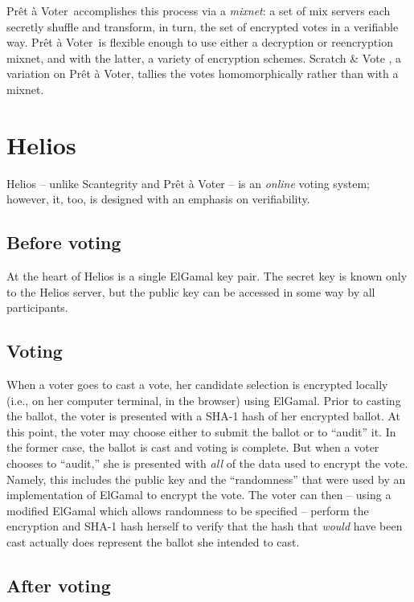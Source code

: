 \documentclass[10pt,twocolumn]{article}
\newcommand{\term}[1]{\textit{#1}}
\newcommand{\preta}{Pr\^{e}t \`{a}}
\newcommand{\pv}{\preta{} Voter}
\begin{document}
\pv\ accomplishes this process via a \term{mixnet}: a set of mix servers each secretly shuffle and transform, in turn, the set of encrypted votes in a verifiable way.
\pv\ is flexible enough to use either a decryption or reencryption mixnet, and with the latter, a variety of encryption schemes.
Scratch \& Vote \cite{scratch}, a variation on \pv, tallies the votes homomorphically rather than with a mixnet.

\section{Helios}

Helios \cite{helios} -- unlike Scantegrity and \pv{} -- is an \emph{online} voting
system; however, it, too, is designed with an emphasis on verifiability.

\subsection{Before voting}

At the heart of Helios is a single ElGamal key pair. The secret key is known only to the Helios
server, but the public key can be accessed in some way by all participants.

\subsection{Voting}

When a voter goes to cast a vote, her candidate selection is encrypted locally (i.e., on her
computer terminal, in the browser) using ElGamal. Prior to casting the ballot, the voter is
presented with a SHA-1 hash of her encrypted ballot. At this point, the voter may choose either
to submit the ballot or to ``audit'' it. In the former case, the ballot is cast and voting is
complete. But when a voter chooses to ``audit,'' she is presented with \emph{all} of the data
used to encrypt the vote. Namely, this includes the public key and the ``randomness'' that were used
by an implementation of ElGamal to encrypt the vote. The voter can then -- using a modified ElGamal
which allows randomness to be specified -- perform the encryption and SHA-1 hash herself
to verify that the hash that \emph{would} have been cast actually does represent the ballot she
intended to cast.

\subsection{After voting}
\end{document}
